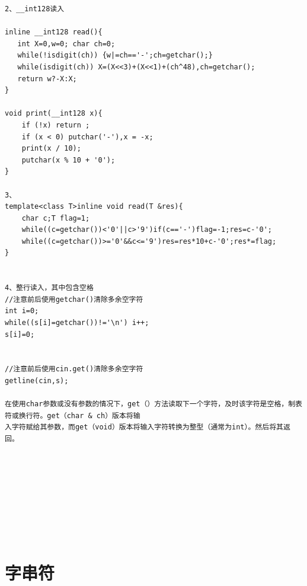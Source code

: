 \documentclass[twoside]{article}
\begin{document}
\begin{lstlisting}
2、__int128读入

inline __int128 read(){
   int X=0,w=0; char ch=0;
   while(!isdigit(ch)) {w|=ch=='-';ch=getchar();}
   while(isdigit(ch)) X=(X<<3)+(X<<1)+(ch^48),ch=getchar();
   return w?-X:X;
}

void print(__int128 x){
	if (!x) return ;
	if (x < 0) putchar('-'),x = -x;
	print(x / 10);
	putchar(x % 10 + '0');
}

3、
template<class T>inline void read(T &res){
    char c;T flag=1;
    while((c=getchar())<'0'||c>'9')if(c=='-')flag=-1;res=c-'0';
    while((c=getchar())>='0'&&c<='9')res=res*10+c-'0';res*=flag;
}


4、整行读入，其中包含空格
//注意前后使用getchar()清除多余空字符
int i=0;
while((s[i]=getchar())!='\n') i++;
s[i]=0;


//注意前后使用cin.get()清除多余空字符
getline(cin,s);

在使用char参数或没有参数的情况下，get（）方法读取下一个字符，及时该字符是空格，制表符或换行符。get（char & ch）版本将输
入字符赋给其参数，而get（void）版本将输入字符转换为整型（通常为int）。然后将其返回。









\end{lstlisting}
\clearpage\section{字串符}
\end{document}
